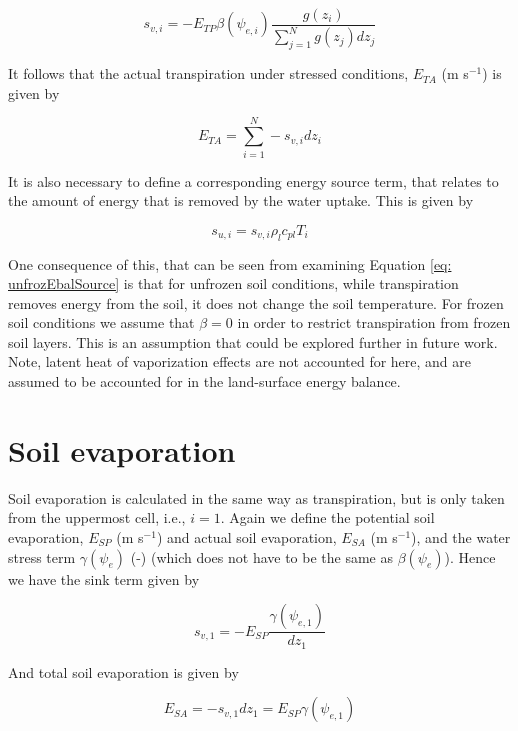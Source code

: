 \documentclass[10pt,a4paper]{article}
\begin{document}
\begin{equation}
s_{v,i}=-E_{TP}\beta(\psi_{e,i})\frac{g(z_i)}{\sum_{j=1}^Ng(z_j)dz_j}
\end{equation}

It follows that the actual transpiration under stressed conditions, $E_{TA}$ (m s$^{-1}$) is given by

\begin{equation}
E_{TA}=\sum_{i=1}^N -s_{v,i} dz_i
\end{equation}

It is also necessary to define a corresponding energy source term, that relates to the amount of energy that is removed by the water uptake. This is given by

\begin{equation}
s_{u,i}=s_{v,i}\rho_l c_{pl}T_i
\end{equation}

One consequence of this, that can be seen from examining Equation \ref{eq: unfrozEbalSource} is that for unfrozen soil conditions, while transpiration removes energy from the soil, it does not change the soil temperature. For frozen soil conditions we assume that $\beta=0$ in order to restrict transpiration from frozen soil layers. This is an assumption that could be explored further in future work. Note, latent heat of vaporization effects are not accounted for here, and are assumed to be accounted for in the land-surface energy balance.

\section{Soil evaporation}

Soil evaporation is calculated in the same way as transpiration, but is only taken from the uppermost cell, i.e., $i=1$. Again we define the potential soil evaporation, $E_{SP}$ (m s$^{-1}$) and actual soil evaporation, $E_{SA}$ (m s$^{-1}$), and the water stress term $\gamma(\psi_e)$ (-) (which does not have to be the same as $\beta(\psi_e)$). Hence we have the sink term given by

\begin{equation}
s_{v,1}=-E_{SP}\frac{\gamma(\psi_{e,1})}{dz_1}
\end{equation}

And total soil evaporation is given by 

\begin{equation}
E_{SA}=-s_{v,1} dz_1 = E_{SP} \gamma(\psi_{e,1})
\end{equation}
\end{document}
